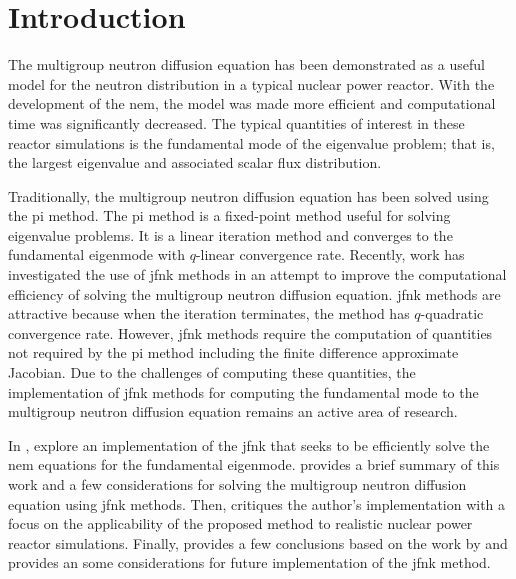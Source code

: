 \section{Introduction}
\label{sec:introduction}

  The multigroup neutron diffusion equation has been demonstrated as a useful
  model for the neutron distribution in a typical nuclear power reactor. With
  the development of the \gls{nem}, the model was made more efficient and
  computational time was significantly decreased. The typical quantities of
  interest in these reactor simulations is the fundamental mode of the
  eigenvalue problem; that is, the largest eigenvalue and associated scalar flux
  distribution.

  Traditionally, the multigroup neutron diffusion equation has been solved using
  the \gls{pi} method. The \gls{pi} method is a fixed-point method useful for
  solving eigenvalue problems. It is a linear iteration method and converges to
  the fundamental eigenmode with $q$-linear convergence rate.  Recently, work
  has investigated the use of \gls{jfnk} methods in an attempt to improve the
  computational efficiency of solving the multigroup neutron diffusion equation.
  \gls{jfnk} methods are attractive because when the iteration terminates, the
  method has $q$-quadratic convergence rate. However, \gls{jfnk} methods require
  the computation of quantities not required by the \gls{pi} method including
  the finite difference approximate Jacobian. Due to the challenges of computing
  these quantities, the implementation of \gls{jfnk} methods for computing the
  fundamental mode to the multigroup neutron diffusion equation remains an
  active area of research.

  In , \citeauthor{qe2paper} explore an implementation of
  the \gls{jfnk} that seeks to be efficiently solve the \gls{nem} equations for
  the fundamental eigenmode.  provides a brief summary of this
  work and a few considerations for solving the multigroup neutron diffusion
  equation using \gls{jfnk} methods. Then,  critiques the
  author's implementation with a focus on the applicability of the proposed
  method to realistic nuclear power reactor simulations. Finally,
   provides a few conclusions based on the work by
  \citeauthor{qe2paper} and provides an some considerations for future
  implementation of the \gls{jfnk} method.
